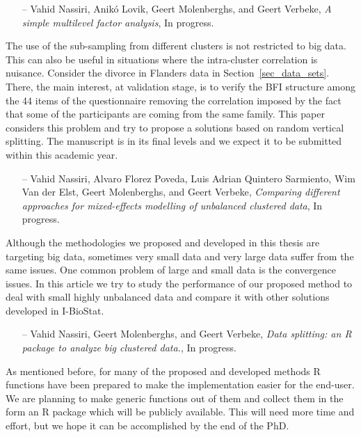\documentclass[14pt]{article}
\begin{document}
\begin{itemize}
\item[--]{\textsf{Vahid Nassiri, Anik\'{o} Lovik, Geert Molenberghs, and Geert Verbeke}}, {\it A simple multilevel factor analysis}, In progress.
\end{itemize}
The use of the sub-sampling from different clusters is not restricted to big data. This can also be useful in situations where the intra-cluster correlation is nuisance. Consider the divorce in Flanders data in Section~\ref{sec_data_sets}. There, the main interest, at validation stage, is to verify the BFI structure among the 44 items of the questionnaire removing the correlation imposed by the fact that some of the participants are coming from the same family. This paper considers this problem and try to propose a solutions based on random vertical splitting. The manuscript is in its final levels and we expect it to be submitted within this academic year.


\begin{itemize}
\item[--]{\textsf{Vahid Nassiri, Alvaro Florez Poveda, Luis Adrian Quintero Sarmiento, Wim Van der Elst, Geert Molenberghs, and Geert Verbeke}}, {\it Comparing different approaches for mixed-effects modelling of unbalanced clustered data}, In progress.
\end{itemize}
Although the methodologies we proposed and developed in this thesis are targeting big data, sometimes very small data and very large data suffer from the same issues. One common problem of large and small data is the convergence issues. In this article we try to study the performance of our proposed method to deal with small highly unbalanced data and compare it with other solutions developed in I-BioStat.


\begin{itemize}
\item[--]{\textsf{Vahid Nassiri, Geert Molenberghs, and Geert Verbeke}}, {\it Data splitting: an \textsf{R} package to analyze big clustered data.}, In progress.
\end{itemize}
As mentioned before, for many of the proposed and developed methods \textsf{R} functions have been prepared to make the implementation easier for the end-user. We are planning to make generic functions out of them and collect them in the form an \textsf{R} package which will be publicly available. This will need more time and effort, but we hope it can be accomplished by the end of the PhD.
\end{document}
